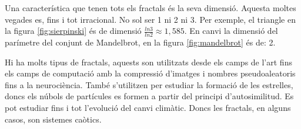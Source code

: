 \noindent Una característica que tenen tots els fractals és la seva dimensió. Aquesta moltes vegades es, fins i tot irracional. No sol ser 1 ni 2 ni 3. Per exemple, el triangle en la figura \ref{fig:sierpinski} és de dimensió $\frac{ln 3}{ln 2} \approx 1,585$. En canvi la dimensió del parímetre del conjunt de Mandelbrot, en la figura \ref{fig:mandelbrot} és de: 2. \n

\noindent Hi ha molts tipus de fractals, aquests son utilitzats desde els camps de l'art fins els camps de computació amb la compressió d'imatges i nombres pseudoaleatoris fins a la neurociència. També s'utilitzen per estudiar la formació de les estrelles, doncs els núbols de partícules es formen a partir del principi d'autosimilitud. Es pot estudiar fins i tot l'evolució del canvi climàtic. Doncs les fractals, en alguns casos, son sistemes caòtics.


